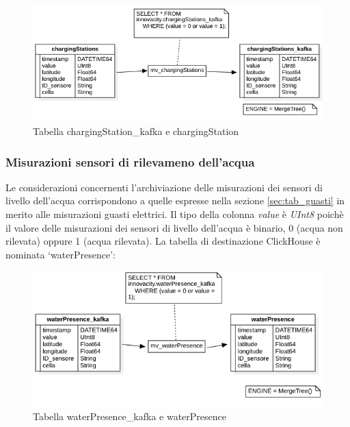 \begin{figure}[H]
    \centering
    \includegraphics[width=1\textwidth]{../Images/SpecificaTecnica/chargingStations.png}
    \caption{Tabella chargingStation\_kafka e chargingStation}
    \label{fig:chargingStation_tables}
  \end{figure}

\subsubsection{Misurazioni sensori di rilevameno dell’acqua}
Le considerazioni concernenti l'archiviazione delle misurazioni dei sensori di livello dell'acqua corrispondono a quelle espresse nella sezione \ref{sec:tab_guasti} in merito alle misurazioni guasti elettrici. Il tipo della colonna \textit{value} è \textit{UInt8} poichè il valore delle misurazioni dei sensori di livello dell'acqua è binario, 0 (acqua non rilevata) oppure 1 (acqua rilevata). La tabella di destinazione ClickHouse è nominata ‘waterPresence’:

\begin{figure}[H]
  \centering
  \includegraphics[width=1\textwidth]{../Images/SpecificaTecnica/waterPresence.png}
  \caption{Tabella waterPresence\_kafka e waterPresence}
  \label{fig:waterPresence_tables}
\end{figure}

